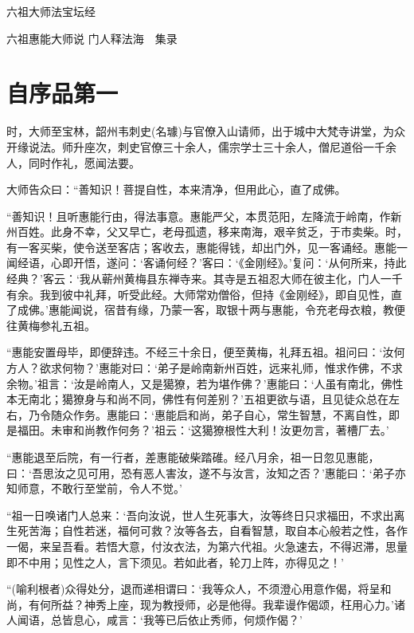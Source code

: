 \documentclass[UTF8, 11pt, oneside]{ctexart}
\begin{document}
\begin{center}
    \LARGE{六祖大师法宝坛经}
\end{center}

\begin{center}
    六祖惠能大师说 \hspace{3em} 门人释法海　集录
\end{center}


\section*{自序品第一}

时，大师至宝林，韶州韦刺史(名璩)与官僚入山请师，出于城中大梵寺讲堂，为众开缘说法。师升座次，刺史官僚三十余人，儒宗学士三十余人，僧尼道俗一千余人，同时作礼，愿闻法要。

大师告众曰：“善知识！菩提自性，本来清净，但用此心，直了成佛。

“善知识！且听惠能行由，得法事意。惠能严父，本贯范阳，左降流于岭南，作新州百姓。此身不幸，父又早亡，老母孤遗，移来南海，艰辛贫乏，于市卖柴。时，有一客买柴，使令送至客店；客收去，惠能得钱，却出门外，见一客诵经。惠能一闻经语，心即开悟，遂问：‘客诵何经？’客曰：‘《金刚经》。’复问：‘从何所来，持此经典？’客云：‘我从蕲州黄梅县东禅寺来。其寺是五祖忍大师在彼主化，门人一千有余。我到彼中礼拜，听受此经。大师常劝僧俗，但持《金刚经》，即自见性，直了成佛。’惠能闻说，宿昔有缘，乃蒙一客，取银十两与惠能，令充老母衣粮，教便往黄梅参礼五祖。

“惠能安置母毕，即便辞违。不经三十余日，便至黄梅，礼拜五祖。祖问曰：‘汝何方人？欲求何物？’惠能对曰：‘弟子是岭南新州百姓，远来礼师，惟求作佛，不求余物。’祖言：‘汝是岭南人，又是獦獠，若为堪作佛？’惠能曰：‘人虽有南北，佛性本无南北；獦獠身与和尚不同，佛性有何差别？’五祖更欲与语，且见徒众总在左右，乃令随众作务。惠能曰：‘惠能启和尚，弟子自心，常生智慧，不离自性，即是福田。未审和尚教作何务？’祖云：‘这獦獠根性大利！汝更勿言，著槽厂去。’

“惠能退至后院，有一行者，差惠能破柴踏碓。经八月余，祖一日忽见惠能，曰：‘吾思汝之见可用，恐有恶人害汝，遂不与汝言，汝知之否？’惠能曰：‘弟子亦知师意，不敢行至堂前，令人不觉。’

“祖一日唤诸门人总来：‘吾向汝说，世人生死事大，汝等终日只求福田，不求出离生死苦海；自性若迷，福何可救？汝等各去，自看智慧，取自本心般若之性，各作一偈，来呈吾看。若悟大意，付汝衣法，为第六代祖。火急速去，不得迟滞，思量即不中用；见性之人，言下须见。若如此者，轮刀上阵，亦得见之！’

“(喻利根者)众得处分，退而递相谓曰：‘我等众人，不须澄心用意作偈，将呈和尚，有何所益？神秀上座，现为教授师，必是他得。我辈谩作偈颂，枉用心力。’诸人闻语，总皆息心，咸言：‘我等已后依止秀师，何烦作偈？’
\end{document}

